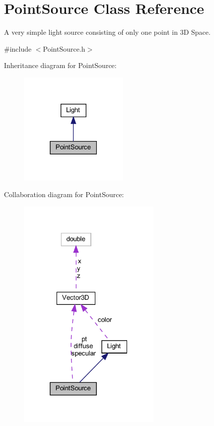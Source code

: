 \hypertarget{classPointSource}{}\section{Point\+Source Class Reference}
\label{classPointSource}


A very simple light source consisting of only one point in 3D Space.  




{\ttfamily \#include $<$Point\+Source.\+h$>$}



Inheritance diagram for Point\+Source\+:
\nopagebreak
\begin{figure}[H]
\begin{center}
\leavevmode
\includegraphics[width=150pt]{classPointSource__inherit__graph}
\end{center}
\end{figure}


Collaboration diagram for Point\+Source\+:
\nopagebreak
\begin{figure}[H]
\begin{center}
\leavevmode
\includegraphics[width=196pt]{classPointSource__coll__graph}
\end{center}
\end{figure}
